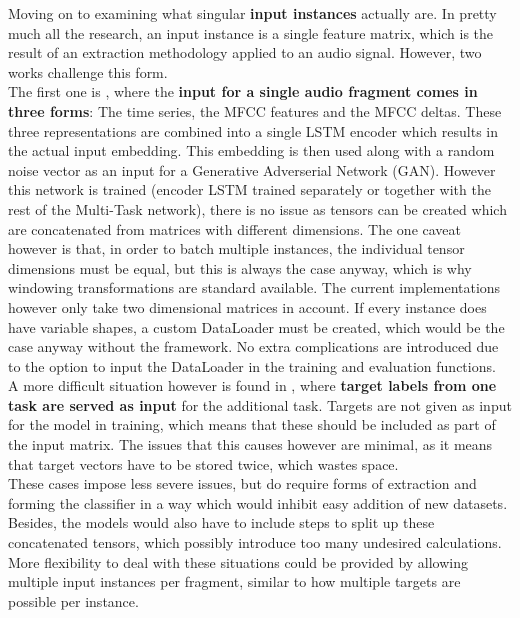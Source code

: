 Moving on to examining what singular \textbf{input instances} actually are. In pretty much all the research, an input instance is a single feature matrix, which is the result of an extraction methodology applied to an audio signal. However, two works challenge this form.\\

The first one is \cite{fernando2020temporarily}, where the \textbf{input for a single audio fragment comes in three forms}: The time series, the MFCC features and the MFCC deltas.  These three representations are combined into a single LSTM encoder which results in the actual input embedding. This embedding is then used along with a random noise vector as an input for a Generative Adverserial Network (GAN). However this network is trained (encoder LSTM trained separately or together with the rest of the Multi-Task network), there is no issue as tensors can be created which are concatenated from matrices with different dimensions. The one caveat however is that, in order to batch multiple instances, the individual tensor dimensions must be equal, but this is always the case anyway, which is why windowing transformations are standard available. The current implementations however only take two dimensional matrices in account. If every instance does have variable shapes, a custom DataLoader must be created, which would be the case anyway without the framework. No extra complications are introduced due to the option to input the DataLoader in the training and evaluation functions.\\

A more difficult situation however is found in \cite{komatsu2020scene}, where \textbf{target labels from one task are served as input} for the additional task. Targets are not given as input for the model in training, which means that these should be included as part of the input matrix. The issues that this causes however are minimal, as it means that target vectors have to be stored twice, which wastes space. \\

These cases impose less severe issues, but do require forms of extraction and forming the classifier in a way which would inhibit easy addition of new datasets. Besides, the models would also have to include steps to split up these concatenated tensors, which possibly introduce too many undesired calculations. More flexibility to deal with these situations could be provided by allowing multiple input instances per fragment, similar to how multiple targets are possible per instance. \\

